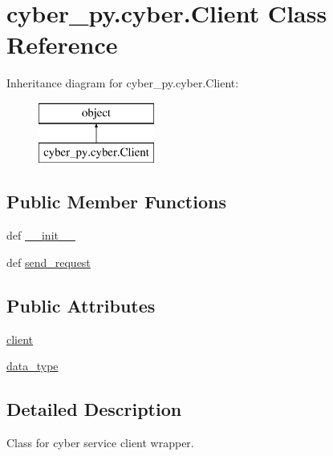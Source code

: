 \hypertarget{classcyber__py_1_1cyber_1_1Client}{\section{cyber\-\_\-py.\-cyber.\-Client Class Reference}
\label{classcyber__py_1_1cyber_1_1Client}
}
Inheritance diagram for cyber\-\_\-py.\-cyber.\-Client\-:\begin{figure}[H]
\begin{center}
\leavevmode
\includegraphics[height=2.000000cm]{classcyber__py_1_1cyber_1_1Client}
\end{center}
\end{figure}
\subsection*{Public Member Functions}
\begin{DoxyCompactItemize}
\item 
def \hyperlink{classcyber__py_1_1cyber_1_1Client_ab3122d6810002464fb74e97619894333}{\-\_\-\-\_\-init\-\_\-\-\_\-}
\item 
def \hyperlink{classcyber__py_1_1cyber_1_1Client_a9e7110cbfe2c5abd6d7821f17fbba4ab}{send\-\_\-request}
\end{DoxyCompactItemize}
\subsection*{Public Attributes}
\begin{DoxyCompactItemize}
\item 
\hyperlink{classcyber__py_1_1cyber_1_1Client_a10e86dbb94c8268317dda6736d082b9e}{client}
\item 
\hyperlink{classcyber__py_1_1cyber_1_1Client_ac47309e59a536f1906adea30181e2562}{data\-\_\-type}
\end{DoxyCompactItemize}


\subsection{Detailed Description}
\begin{DoxyVerb}Class for cyber service client wrapper.
\end{DoxyVerb}
 


